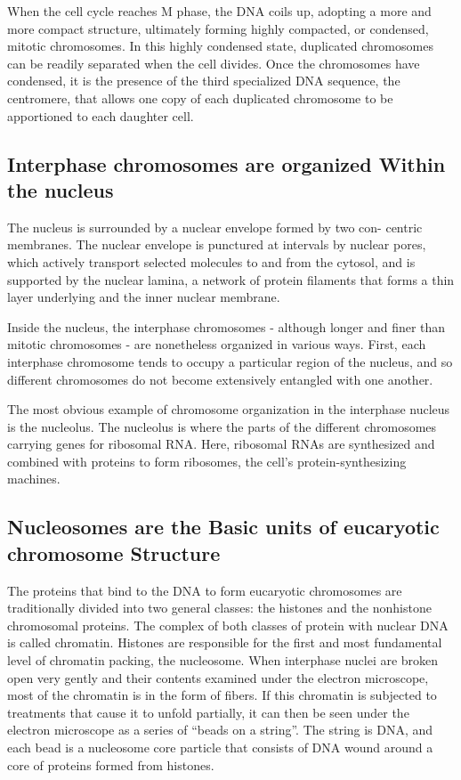 When the cell cycle reaches M phase, the DNA coils up, adopting a more
and more compact structure, ultimately forming highly compacted, or
condensed, mitotic chromosomes. In this highly condensed state, duplicated
chromosomes can be readily separated when the cell divides.
Once the chromosomes have condensed, it is the presence of the
third specialized DNA sequence, the centromere, that allows one copy
of each duplicated chromosome to be apportioned to each daughter cell.

\subsection{Interphase chromosomes are organized Within the nucleus}

The nucleus is surrounded by a nuclear envelope formed by two con-
centric membranes. The nuclear envelope is punctured at intervals by
nuclear pores, which actively transport selected molecules to and from
the cytosol, and is supported by the
nuclear lamina, a network of protein filaments that forms a thin layer
underlying and the inner nuclear membrane.

Inside the nucleus, the interphase chromosomes - although longer and
finer than mitotic chromosomes - are nonetheless organized in various
ways. First, each interphase chromosome tends to occupy a particular
region of the nucleus, and so different chromosomes do not become
extensively entangled with one another.

The most obvious example of chromosome organization in the interphase
nucleus is the nucleolus. The nucleolus is where the
parts of the different chromosomes carrying genes for ribosomal RNA.
Here, ribosomal RNAs are synthesized and combined with proteins to
form ribosomes, the cell’s protein-synthesizing machines.

\subsection{Nucleosomes are the Basic units of eucaryotic chromosome Structure}

The proteins that bind to the DNA to form eucaryotic chromosomes
are traditionally divided into two general classes: the histones and the
nonhistone chromosomal proteins.
The complex of both classes of protein with nuclear DNA is called chromatin.
Histones are responsible for the first and most fundamental level of chromatin
packing, the nucleosome. When interphase nuclei are broken open very gently
and their contents examined under the electron microscope, most of the chromatin is in the form
of fibers. If this chromatin is subjected
to treatments that cause it to unfold partially, it can
then be seen under the electron microscope as a series of “beads on
a string”. The string is DNA, and each bead is a nucleosome
core particle that consists of DNA wound around a core of proteins formed from histones.

